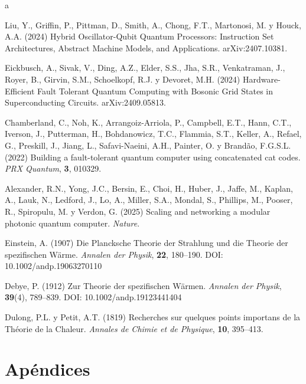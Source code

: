 \documentclass[11pt,a4paper,spanish]{book}
\begin{document}
\begin{thebibliography}{a}

 Liu, Y., Griffin, P., Pittman, D., Smith, A., Chong, F.T., Martonosi, M. y Houck, A.A. (2024) Hybrid Oscillator-Qubit Quantum Processors: Instruction Set Architectures, Abstract Machine Models, and Applications. arXiv:2407.10381.

 Eickbusch, A., Sivak, V., Ding, A.Z., Elder, S.S., Jha, S.R., Venkatraman, J., Royer, B., Girvin, S.M., Schoelkopf, R.J. y Devoret, M.H. (2024) Hardware-Efficient Fault Tolerant Quantum Computing with Bosonic Grid States in Superconducting Circuits. arXiv:2409.05813.

 Chamberland, C., Noh, K., Arrangoiz-Arriola, P., Campbell, E.T., Hann, C.T., Iverson, J., Putterman, H., Bohdanowicz, T.C., Flammia, S.T., Keller, A., Refael, G., Preskill, J., Jiang, L., Safavi-Naeini, A.H., Painter, O. y Brandão, F.G.S.L. (2022) Building a fault-tolerant quantum computer using concatenated cat codes. \textit{PRX Quantum}, \textbf{3}, 010329.

 Alexander, R.N., Yong, J.C., Bersin, E., Choi, H., Huber, J., Jaffe, M., Kaplan, A., Lauk, N., Ledford, J., Lo, A., Miller, S.A., Mondal, S., Phillips, M., Pooser, R., Spiropulu, M. y Verdon, G. (2025) Scaling and networking a modular photonic quantum computer. \textit{Nature}.


 Einstein, A. (1907) Die Plancksche Theorie der Strahlung und die Theorie der spezifischen Wärme. \textit{Annalen der Physik}, \textbf{22}, 180--190. DOI: 10.1002/andp.19063270110

 Debye, P. (1912) Zur Theorie der spezifischen Wärmen. \textit{Annalen der Physik}, \textbf{39}(4), 789--839. DOI: 10.1002/andp.19123441404

 Dulong, P.L. y Petit, A.T. (1819) Recherches sur quelques points importans de la Théorie de la Chaleur. \textit{Annales de Chimie et de Physique}, \textbf{10}, 395--413.

\end{thebibliography}
% 
%


\appendix
\chapter{Apéndices}
\end{document}
